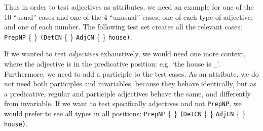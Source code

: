 \documentclass[11pt]{article}
\def\t#1{\texttt{#1}}
\begin{document}


\noindent Thus in order to test adjectives as attributes, we need an example for
one of the 10 ``usual'' cases and one of the 4 ``unusual'' cases, one
of each type of adjective, and one of each number.  
The following test set creates all the relevant cases: 
 \t{PrepNP} \{  \}
             {\tt (DetCN} \{  \} 
             {\tt AdjCN}  \{ \} 
             {\tt house)}.


If we wanted to test \emph{adjectives} exhaustively, we would need one more context, where
the adjective is in the predicative position: e.g. `the house is \verb|_|'.
Furthermore, we need to add a participle to the test cases.
As an attribute, we do not need both participles and invariables,
because they behave identically, but as a predicative, regular and
participle adjectives behave the same, and differently from
invariable. If we want to test specifically adjectives and not
\t{PrepNP}, we would prefer to see all types in all positions:
 \t{PrepNP} \{  \}
             {\tt (DetCN} \{  \} 
             {\tt AdjCN}  \{ \} 
             {\tt house)}.
\end{document}
